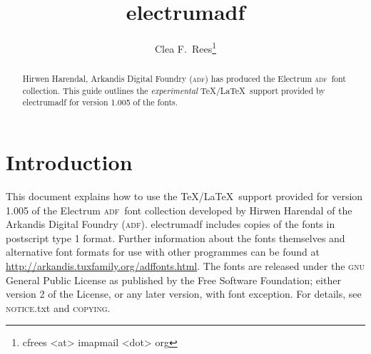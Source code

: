 \documentclass[11pt,british]{article}
\title{electrumadf}
\author{Clea F.\ Rees\footnote{cfrees <at> imapmail <dot> org}}
\date{\dyddiad}
\begin{document}
\maketitle\thispagestyle{empty}
\setlength{\parindent}{0pt}
\setlength{\parskip}{0.5em}
	
	
\newcommand*{\adf}{\textsc{adf}}
\newcommand*{\lpack}[1]{\textsf{#1}}
\newcommand*{\fgroup}[1]{\textsf{#1}}
\newcommand*{\fname}[1]{\textsf{#1}}

\begin{abstract}
	\hspace*{-\parindent}Hirwen Harendal, Arkandis Digital Foundry (\adf) has produced the Electrum \adf\ font collection. This guide outlines the \emph{experimental} \TeX/\LaTeX\ support provided by \lpack{electrumadf} for version 1.005 of the fonts.
\end{abstract}

\tableofcontents

\section{Introduction}

This document explains how to use the \TeX/\LaTeX\ support provided for version 1.005 of the Electrum \adf\ font collection developed by Hirwen Harendal of the Arkandis Digital Foundry (\adf). \lpack{electrumadf} includes copies of the fonts in postscript type 1 format. Further  information about the fonts themselves and alternative font formats for use with other programmes can be found at \url{http://arkandis.tuxfamily.org/adffonts.html}. The fonts are released under the \textsc{gnu} General Public License as published by the Free Software Foundation; either version 2 of the License, or any later version, with font exception. For details, see \textsc{notice}.txt and \textsc{copying}.
\end{document}
